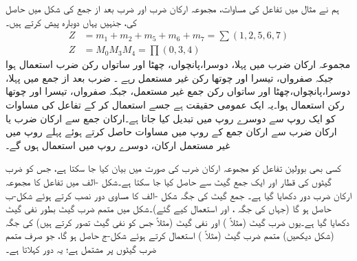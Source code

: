 ہم نے مثال  میں تفاعل کی مساوات، مجموعہ ارکان ضرب اور  ضرب بعد از جمع کی  شکل میں حاصل کی، جنہیں یہاں دوبارہ پیش کرتے ہیں۔
\begin{align*}
Z&=m_1+m_2+m_5+m_6+m_7=\sum(1,2,5,6,7)\\
Z&=M_0 M_3 M_4=\prod (0,3,4)
\end{align*}
مجموعہ ارکان ضرب میں پہلا، دوسرا،پانچواں، چھٹا اور ساتواں رکن ضرب استعمال ہوا جبکہ صفرواں، تیسرا اور چوتھا رکن غیر مستعمل رہے ۔ ضرب بعد از جمع میں پہلا، دوسرا،پانچواں،چھٹا اور ساتواں رکن جمع غیر مستعمل، جبکہ صفرواں، تیسرا اور چوتھا رکن استعمال ہوا۔یہ ایک عمومی حقیقت ہے جسے استعمال کر کے تفاعل کی مساوات کو ایک روپ سے دوسرے روپ میں تبدیل کیا جاتا ہے۔ارکان جمع سے ارکان ضرب یا ارکان ضرب سے ارکان جمع کے روپ میں مساوات حاصل کرتے ہوئے پہلے روپ میں غیر مستعمل ارکان، دوسرے روپ میں استعمال ہوں گے۔ 

کسی بھی بوولین تفاعل کو مجموعہ ارکان ضرب کی صورت میں بیان کیا جا سکتا ہے، جس کو ضرب گیٹوں کی قطار اور ایک جمع گیٹ سے حاصل کیا جا سکتا ہے۔شکل -الف میں تفاعل  کا مجموعہ ارکان ضرب دور دکھایا گیا ہے۔ جمع گیٹ  کی جگہ شکل -الف کا مساوی دور نصب کرتے ہوئے شکل-ب حاصل ہو گا (جہاں  کی جگہ ،  اور  استعمال کیے گئے)۔شکل  میں متمم ضرب گیٹ بطور نفی گیٹ دکھایا گیا ہے۔یوں ضرب گیٹ (مثلاً ) اور نفی گیٹ (مثلاً  جس کو نفی گیٹ تصور کرتے ہیں) کی جگہ (شکل  دیکھیں) متمم ضرب گیٹ (مثلاً ) استعمال کرتے ہوئے شکل-ج حاصل ہو گا، جو صرف متمم ضرب گیٹوں پر مشتمل ہے؛ یہ  دور کہلاتا ہے۔ 

